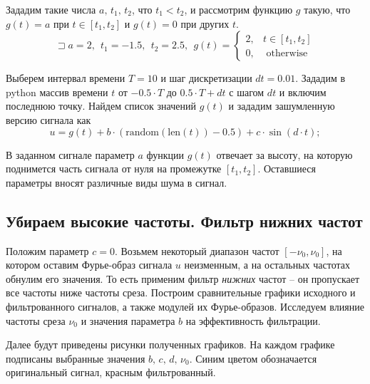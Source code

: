 \documentclass[a4paper, 12pt]{article}
\begin{document}
    Зададим такие числа $a,\,t_1,\,t_2$, что $t_1<t_2$, и рассмотрим функцию $g$ такую, что
    $g(t)=a$ при $t\in[t_1,t_2]$ и $g(t)=0$ при других $t$. $$\sqsupset a=2,\ \ t_1=-1.5,\ \ t_2=2.5,\ \ g(t)=
    \begin{cases}
        2, & t\in[t_1,t_2]\\
        0, & \text{ otherwise}
    \end{cases}
    $$


    Выберем интервал времени $T=10$ и шаг дискретизации $dt=0.01$. Зададим в python массив времени $t$ от $-0.5\cdot T$ до $0.5\cdot T+dt$
    с шагом $dt$ и включим последнюю точку. Найдем список значений $g(t)$ и зададим зашумленную версию сигнала как
    $$
    u=g(t)+b\cdot(\text{random}(\text{len}(t))-0.5) + c\cdot \sin(d\cdot t);
    $$


    В заданном сигнале параметр $a$ функции $g(t)$ отвечает за высоту, на которую поднимется часть сигнала от нуля на промежутке $[t_1,t_2]$.
    Оставшиеся параметры вносят различные виды шума в сигнал.


    \subsection{Убираем высокие частоты. Фильтр нижних частот}
    Положим параметр $c=0$. Возьмем некоторый диапазон частот $[-\nu_0, \nu_0]$, на котором оставим Фурье-образ
    сигнала $u$ неизменным, а на остальных частотах обнулим его значения. То есть применим фильтр \textit{нижних} частот -- он пропускает
    все частоты ниже частоты среза. Построим сравнительные графики исходного и фильтрованного сигналов, а также модулей
    их Фурье-образов. Исследуем влияние частоты среза $\nu_0$ и значения параметра $b$ на эффективность фильтрации.
    
    
    Далее будут приведены рисунки полученных графиков. На каждом графике подписаны выбранные значения $b,\,c,\,d,\,\nu_0$.
    Синим цветом обозначается оригинальный сигнал, красным фильтрованный.
\end{document}
